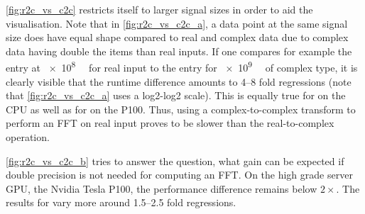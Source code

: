 \cref{fig:r2c_vs_c2c} restricts itself to larger signal sizes in order to aid the visualisation. Note that in \cref{fig:r2c_vs_c2c_a}, a data point at the same signal size does have equal shape compared to real and complex data due to complex data having double the items than real inputs. If one compares for example the entry at \SI[exponent-base=2]{e8}{\mebi\byte} for real input to the entry for \SI[exponent-base=2]{e9}{\mebi\byte} of complex type, it is clearly visible that the runtime difference amounts to \numrange{4}{8} fold regressions (note that \cref{fig:r2c_vs_c2c_a} uses a log2-log2 scale). This is equally true for \fftw{} on the CPU as well as for \cufft{} on the P100. Thus, using a complex-to-complex transform to perform an FFT on real input proves to be slower than the real-to-complex operation.

\cref{fig:r2c_vs_c2c_b} tries to answer the question, what gain can be expected if double precision is not needed for computing an FFT. On the high grade server GPU, the Nvidia Tesla P100, the performance difference remains below $2{\times}$. The results for \fftw{} vary more around \numrange{1.5}{2.5} fold regressions. 




